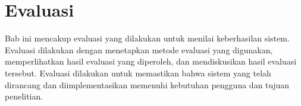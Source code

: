 \chapter{Evaluasi}
\label{chapter:evaluasi}
Bab ini mencakup evaluasi yang dilakukan untuk menilai keberhasilan sistem. Evaluasi dilakukan dengan menetapkan metode evaluasi yang digunakan, memperlihatkan hasil evaluasi yang diperoleh, dan mendiskusikan hasil evaluasi tersebut. Evaluasi dilakukan untuk memastikan bahwa sistem yang telah dirancang dan diimplementasikan memenuhi kebutuhan pengguna dan tujuan penelitian.





